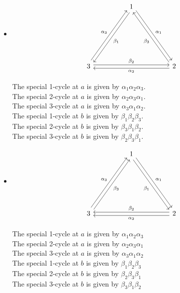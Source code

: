 \documentclass{amsart}
\numberwithin{figure}{section}
\begin{document}
\begin{itemize}
    \item[2)] 
    \leavevmode
    \begin{center}
        \[\begin{tikzcd}[row sep=huge,column sep=huge]
	& 1 & \\
	\\
	3 && 2
	\arrow["{\beta_1}", shift left, from=1-2, to=3-1]
	\arrow["{\alpha_1}", shift left, from=1-2, to=3-3]
	\arrow["{\alpha_3}", shift left, from=3-1, to=1-2]
	\arrow["{\beta_2}", shift left, from=3-1, to=3-3]
	\arrow["{\beta_3}", shift left, from=3-3, to=1-2]
	\arrow["{\alpha_2}", shift left, from=3-3, to=3-1]
\end{tikzcd}\]
    \end{center}
The special 1-cycle at $a$ is given by $\alpha_1\alpha_2\alpha_3$.\\
The special 2-cycle at $a$ is given by $\alpha_2\alpha_3\alpha_1$.\\
The special 3-cycle at $a$ is given by $\alpha_3\alpha_1\alpha_2$.\\
The special 1-cycle at $b$ is given by $\beta_1\beta_2\beta_3$.\\
The special 2-cycle at $b$ is given by $\beta_3\beta_1\beta_2$.\\
The special 3-cycle at $b$ is given by $\beta_2\beta_3\beta_1$.\\

\item[3)] 

\leavevmode
\begin{center}
\[\begin{tikzcd}[row sep=huge,column sep=huge]
	& 1 & \\
	\\
	3 && 2
	\arrow["{\alpha_1}", shift left, from=1-2, to=3-3]
	\arrow["{\beta_1}"', shift right, from=1-2, to=3-3]
	\arrow["{\alpha_3}", shift left, from=3-1, to=1-2]
	\arrow["{\beta_3}"', shift right, from=3-1, to=1-2]
	\arrow["{\alpha_2}", shift left, from=3-3, to=3-1]
	\arrow["{\beta_2}"', shift right, from=3-3, to=3-1]
\end{tikzcd}\]
\end{center}
The special 1-cycle at $a$ is given by $\alpha_1\alpha_2\alpha_3$\\
The special 2-cycle at $a$ is given by $\alpha_2\alpha_3\alpha_1$\\
The special 3-cycle at $a$ is given by $\alpha_3\alpha_1\alpha_2$\\
The special 1-cycle at $b$ is given by $\beta_1\beta_2\beta_3$\\
The special 2-cycle at $b$ is given by $\beta_2\beta_3\beta_1$\\
The special 3-cycle at $b$ is given by $\beta_3\beta_1\beta_2$\\


\end{itemize}
\end{document}
